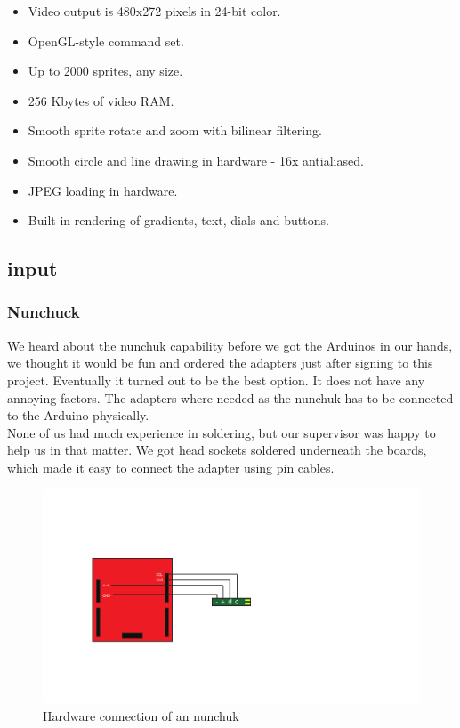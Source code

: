 \begin{itemize}
  \footnotesize
  \item Video output is 480x272 pixels in 24-bit color.
  \item OpenGL-style command set.
  \item Up to 2000 sprites, any size.
  \item 256 Kbytes of video RAM.
  \item Smooth sprite rotate and zoom with bilinear filtering.
  \item Smooth circle and line drawing in hardware - 16x antialiased.
  \item JPEG loading in hardware.
  \item Built-in rendering of gradients, text, dials and buttons.
\end{itemize}


\subsection{input}

\subsubsection{Nunchuck}%

We heard about the nunchuk capability before we got the Arduinos in our 
hands, we thought it would be fun and ordered the adapters just after signing
to this project. Eventually it turned out to be the best option. It does
not have any annoying factors. The adapters where needed as the nunchuk
has to be connected to the Arduino physically.
\\
None of us had much experience in soldering, but our supervisor was happy
to help us in that matter. We got head sockets soldered underneath
the boards, which made it easy to connect the adapter using pin cables.

\begin{figure}[h]
  \centering
  \includegraphics{Figures/NunchuckConnection}
  \caption{Hardware connection of an nunchuk}
  \label{fig:nunchuk_connect}
\end{figure}


